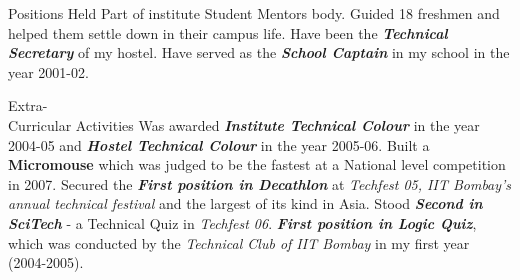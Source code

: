 \documentclass[final]{resume}
\begin{document}


\begin{category}{Positions Held}
\citembullet Part of institute Student Mentors body. Guided 18 freshmen and helped them settle down in their campus life.
\citembullet Have been the \textbf{\textit{Technical Secretary}} of my hostel.
\citembullet Have served as the \textbf{\textit{School Captain}} in my school in the year 2001-02.
\end{category}
\vspace{1pt}


\begin{category}{Extra-\\Curricular Activities}
\citembullet Was awarded \textbf{\textit{Institute Technical Colour}} in the year 2004-05 and \textbf{\textit{Hostel Technical Colour}} in the year 2005-06.%
\citembullet Built a \textbf{Micromouse} which was judged to be the fastest at a National level competition in 2007. 
\citembullet Secured the \textbf{\textit{First position in Decathlon}} at \emph{Techfest 05, IIT Bombay's annual technical festival} and the largest of its kind in Asia.
\citembullet Stood \textbf{\textit{Second in SciTech}} - a Technical Quiz in \emph{Techfest 06}.
\citembullet \textbf{\textit{First position in Logic Quiz}}, which was conducted by the \emph{Technical Club of IIT Bombay} in my first year (2004-2005).
\end{category}



\end{document}
